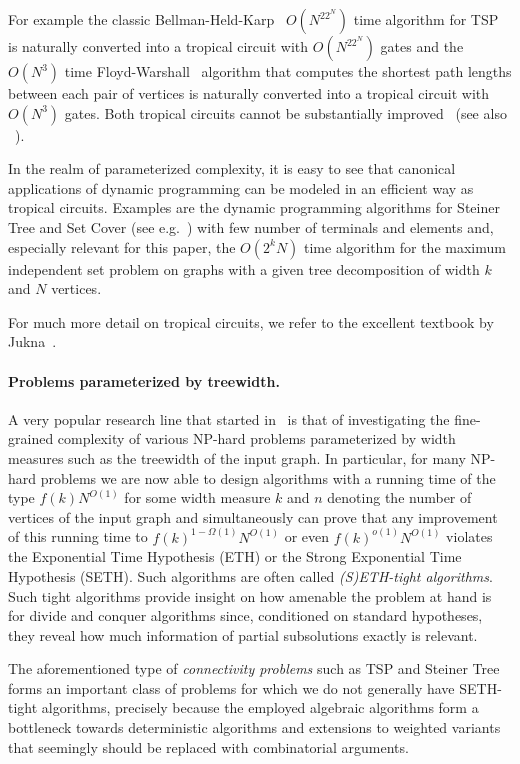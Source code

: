 For example the classic Bellman-Held-Karp~\cite{Bellman62,heldKarp} $O(N^22^N)$ time algorithm for TSP is naturally converted into a tropical circuit with $O(N^22^N)$ gates and the $O(N^3)$ time Floyd-Warshall~\cite{Floyd62a,Warshall62} algorithm that computes the shortest path lengths between each pair of vertices is naturally converted into a tropical circuit with $O(N^3)$ gates. Both tropical circuits cannot be substantially improved~\cite{JerrumS82,kerr1970effect} (see also ~\cite[Corollary~2.2]{Jukna2023}).

In the realm of parameterized complexity, it is easy to see that canonical applications of dynamic programming can be modeled in an efficient way as tropical circuits. Examples are the dynamic programming algorithms for Steiner Tree and Set Cover (see e.g.~\cite[Section 6.1]{CyganFKLMPPS15}) with few number of terminals and elements and, especially relevant for this paper, the $O(2^{k} N)$ time algorithm for the maximum independent set problem on graphs with a given tree decomposition of width $k$ and $N$ vertices.

For much more detail on tropical circuits, we refer to the excellent textbook by Jukna~\cite{Jukna2023}.

\paragraph{Problems parameterized by treewidth.}
A very popular research line that started in~\cite{LokshtanovMS18b,LokshtanovMS18a} is that of investigating the fine-grained complexity of various NP-hard problems parameterized by width measures such as the treewidth of the input graph. 
In particular, for many NP-hard problems we are now able to design algorithms with a running time of the type $f(k)N^{O(1)}$ for some width measure $k$ and $n$ denoting the number of vertices of the input graph and simultaneously can prove that any improvement of this running time to $f(k)^{1-\Omega(1)}N^{O(1)}$ or even $f(k)^{o(1)}N^{O(1)}$ violates the Exponential Time Hypothesis (ETH) or the Strong Exponential Time Hypothesis (SETH). Such algorithms are often called \emph{(S)ETH-tight algorithms}. Such tight algorithms provide insight on how amenable the problem at hand is for divide and conquer algorithms since, conditioned on standard hypotheses, they reveal how much information of partial subsolutions exactly is relevant.

The aforementioned type of \emph{connectivity problems} such as TSP and Steiner Tree forms an important class of problems for which we do not generally have SETH-tight algorithms, precisely because the employed algebraic algorithms form a bottleneck towards deterministic algorithms and extensions to weighted variants that seemingly should be replaced with combinatorial arguments.


